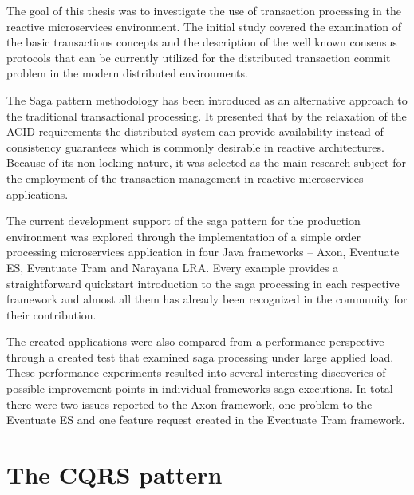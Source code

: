 \documentclass[oneside,
  digital, %
  table,   %
  nolof,     %
  nolot,     %
]{fithesis3}
\begin{document}
The goal of this thesis was to investigate the use of transaction processing in the reactive microservices environment. The initial study covered the examination of the basic transactions concepts and the description of the well known consensus protocols that can be currently utilized for the distributed transaction commit problem in the modern distributed environments. 

The Saga pattern \cite{sagas_publ} methodology has been introduced as an alternative approach to the traditional transactional processing. It presented that by the relaxation of the ACID requirements the distributed system can provide availability instead of consistency guarantees which is commonly desirable in reactive architectures. Because of its non-locking nature, it was selected as the main research subject for the employment of the transaction management in reactive microservices applications.

The current development support of the saga pattern for the production  environment was explored through the implementation of a simple order processing microservices application in four Java frameworks -- Axon, Eventuate ES, Eventuate Tram and Narayana LRA. Every example provides a straightforward quickstart introduction to the saga processing in each respective framework and almost all them has already been recognized in the community for their contribution.

The created applications were also compared from a performance perspective through a created test that examined saga processing under large applied load. These performance experiments resulted into several interesting discoveries of possible improvement points in individual frameworks saga executions. In total there were two issues reported to the Axon framework, one problem to the Eventuate ES and one feature request created in the Eventuate Tram framework.



\makeatletter\thesis@blocks@clear\makeatother
{} %
\printindex




\appendix %

\clearpage
\chapter{The CQRS pattern}
\label{sec:appendix-cqrs}
\end{document}
